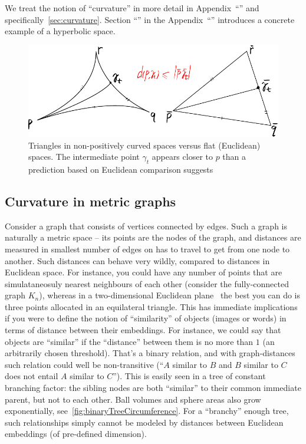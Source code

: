 We treat the notion of ``curvature'' in more detail in
Appendix~``'' and specifically~\autoref{sec:curvature}.
Section ``'' in the
Appendix~``'' introduces a concrete example of a
hyperbolic space.

\begin{figure}[ht]\center
    \includegraphics[width=.9\textwidth]{art/npc-comparison-triangle.pdf}
    \caption{Triangles in non-positively curved spaces versus flat (Euclidean) spaces.
    The intermediate point \( \gamma_t \) appears closer to \( p \)
    than a prediction based on Euclidean comparison suggests}
    \label{fig:npcSpaces}
\end{figure}

\subsection*{Curvature in metric graphs}

Consider a graph that consists of vertices connected by edges. Such a graph is
naturally
a metric space -- its points are the nodes of the graph, and distances are
measured in smallest number of edges on has to travel to get from one node to
another.  Such distances can behave very wildly, compared to
distances in Euclidean
space. For instance, you could have any number of points that are
simulataneosuly nearest neighbours of each other (consider the fully-connected
graph \( K_n \)), whereas in a two-dimensional Euclidean
plane~\cite{howManyNeighbours} the best you can do is three points allocated in
an equilateral triangle. This has immediate implications if you were to define
the notion of ``similarity'' of objects (images or words) in terms of distance
between their embeddings.  For instance, we could say that objects are
``similar'' if the ``distance'' between them is no more than \( 1 \) (an
arbitrarily chosen threshold).  That's a binary relation, and with
graph-distances such relation could well be non-transitive (``$A$ similar to
$B$ and $B$ similar to $C$ does not entail $A$ similar to $C$''). This is easily
seen
in a tree of constant branching factor: the sibling nodes are both ``similar''
to their common immediate parent, but not to each other. Ball volumes and
sphere areas also grow exponentially, see~\autoref{fig:binaryTreeCircumference}.
For a ``branchy'' enough tree, such relationships simply cannot be modeled by
distances between Euclidean embeddings (of pre-defined dimension).

